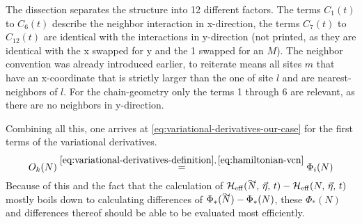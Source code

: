 The dissection separates the structure into 12 different factors. The terms $C_1(t)$ to $C_6(t)$ describe the neighbor interaction in x-direction, the terms $C_7(t)$ to $C_{12}(t)$ are identical with the interactions in y-direction (not printed, as they are identical with the x swapped for y and the 1 swapped for an $M$).
The neighbor convention was already introduced earlier, to reiterate  means \glqq all sites $m$ that have an x-coordinate that is strictly larger than the one of site $l$ and are nearest-neighbors of $l$\grqq{}.
For the chain-geometry only the terms 1 through 6 are relevant, as there are no neighbors in y-direction.

Combining all this, one arrives at \autoref{eq:variational-derivatives-our-case} for the first terms of the variational derivatives.
\begin{equation}
    \label{eq:variational-derivatives-our-case}
    O_{k}(N) \stackrel{\ref{eq:variational-derivatives-definition},\,\ref{eq:hamiltonian-vcn}}{=}
    \Phi_i(N)
\end{equation}
Because of this and the fact that the calculation of $\HeffOft[\vphantom{N}\smash{\tilde{N}},\,\vec{\eta}]-\HeffOft[N,\,\vec{\eta}]$ mostly boils down to calculating differences of $\Phi_\ast(\vphantom{N}\smash{\tilde{N}})-\Phi_\ast(N)$, these $\Phi_\ast(N)$ and differences thereof should be able to be evaluated most efficiently.